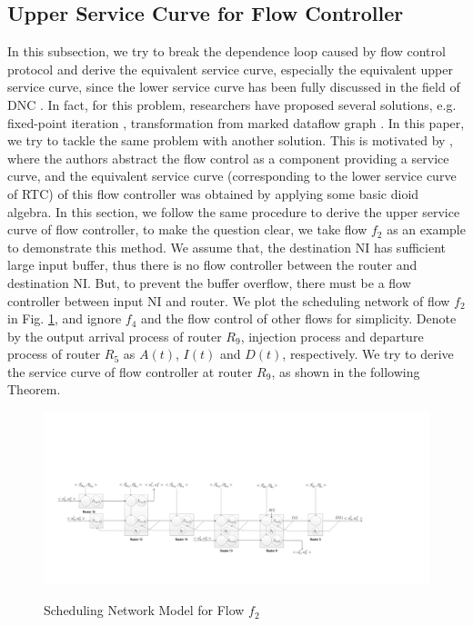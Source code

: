 \documentclass[10pt,journal]{IEEEtran}
\begin{document}
\subsection{Upper Service Curve for Flow Controller}\label{flowcontrol}
In this subsection, we try to break the dependence loop caused by flow control protocol and derive the equivalent service curve, especially the equivalent upper service curve, since the lower service curve has been fully discussed in the field of DNC \cite{Boudec2001Network}. In fact, for this problem, researchers have proposed several solutions, e.g. fixed-point iteration \cite{schioler2005network}\cite{Jonsson:2008:CDM:1450058.1450083}, transformation from marked dataflow graph \cite{Thiele:2009:MPA:1629335.1629353}. In this paper, we try to tackle the same problem with another solution. This is motivated by \cite{QLDD09FC}, where the authors abstract the flow control as a component providing a service curve, and the equivalent service curve (corresponding to the lower service curve of RTC) of this flow controller was obtained by applying some basic dioid algebra. In this section, we follow the same procedure to derive the upper service curve of flow controller, to make the question clear, we take flow $f_2$ as an example to demonstrate this method. We assume that, the destination NI has sufficient large input buffer, thus there is no flow controller between the router and destination NI. But, to prevent the buffer overflow, there must be a flow controller between input NI and router. We plot the scheduling network of flow $f_2$ in Fig. \ref{f2}, and ignore $f_4$ and the flow control of other flows for simplicity. Denote by the output arrival process of router $R_9$, injection process and departure process of router $R_{5}$ as $A(t)$, $I(t)$ and $D(t)$, respectively. We try to derive the service curve of flow controller at router $R_9$, as shown in the following Theorem.
\begin{figure}
  \centering
  \includegraphics[scale=0.35]{figures/f2.pdf}\\
  \caption{Scheduling Network Model for Flow $f_2$}\label{f2}
\end{figure}
\end{document}
